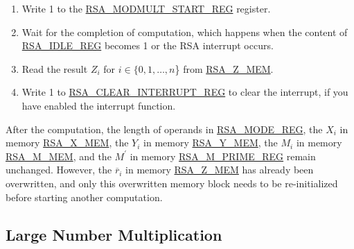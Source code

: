 \documentclass[main\_\_EN.tex]{subfiles}
\begin{document}
\begin{enumerate}
        Users need to write data to each memory block only according to the length of the number; data beyond this length are ignored.

    \item Write 1 to the \hyperref[regdesc:RSAMODMULTSTARTREG]{RSA\_MODMULT\_START\_REG} register.

    \item Wait for the completion of computation, which happens when the content of \hyperref[regdesc:RSAIDLEREG]{RSA\_IDLE\_REG} becomes 1 or the RSA interrupt occurs.

    \item Read the result \begin{math}Z_{i}\end{math} for \begin{math}i \in \{ 0, 1, \dots, n \end{math}\} from \hyperref[regdesc:RSAmemory]{RSA\_Z\_MEM}.
    \item Write 1 to \hyperref[regdesc:RSACLEARINTERRUPTREG]{RSA\_CLEAR\_INTERRUPT\_REG} to clear the interrupt, if you have enabled the interrupt function.

\end{enumerate}

After the computation, the length of operands in \hyperref[regdesc:RSAMODEREG]{RSA\_MODE\_REG}, the \begin{math}X_{i}\end{math} in memory \hyperref[regdesc:RSAmemory]{RSA\_X\_MEM}, the \begin{math}Y_{i}\end{math} in memory \hyperref[regdesc:RSAmemory]{RSA\_Y\_MEM}, the \begin{math}M_{i}\end{math} in memory \hyperref[regdesc:RSAmemory]{RSA\_M\_MEM}, and the \begin{math}M^{\prime}\end{math} in memory \hyperref[regdesc:RSAMPRIMEREG]{RSA\_M\_PRIME\_REG} remain unchanged. However, the \begin{math}\overline{r}_{i}\end{math} in memory \hyperref[regdesc:RSAmemory]{RSA\_Z\_MEM} has already been overwritten, and only this overwritten memory block needs to be re-initialized before starting another computation.

\subsection{Large Number Multiplication}
\end{document}
